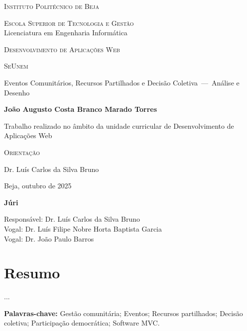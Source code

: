 \documentclass[12pt,a4paper,openright,oneside]{memoir}
\newcommand{\Institute}{Instituto Politécnico de Beja}
\newcommand{\School}{Escola Superior de Tecnologia e Gestão}
\newcommand{\Degree}{Licenciatura em Engenharia Informática}
\newcommand{\Course}{Desenvolvimento de Aplicações Web}
\newcommand{\Title}{SeUnem}
\newcommand{\Subtitle}{Eventos Comunitários, Recursos Partilhados e Decisão Coletiva\mbox{ --- }Análise e Desenho}
\newcommand{\Author}{João Augusto Costa Branco Marado Torres}
\newcommand{\Advisor}{Dr. Luís Carlos da Silva Bruno}
\newcommand{\JuryMemberFirst}{Dr. Luís Filipe Nobre Horta Baptista Garcia}
\newcommand{\JuryMemberSecond}{Dr. João Paulo Barros}
\newcommand{\Date}{Beja, outubro de 2025}
\begin{document}
\thispagestyle{empty}
\begin{center}
    \textsc{\large \Institute}

    \bigskip

    \textsc{\large \School}\\{\large \Degree}

    \bigskip

    \textsc{\large \Course}

    \vspace{4\baselineskip}

    \textsc{\Huge \Title}

    \smallskip

    {\Large \Subtitle}

    \bigskip

    {\large\bfseries \Author}

    \vspace{2\baselineskip}

    {\large Trabalho realizado no âmbito da unidade curricular de \Course}

    \vspace{2\baselineskip}

    \textsc{Orientação}

    \bigskip

    \Advisor

    \vfill

    {\footnotesize \Date}
\end{center}

\cleardoublepage

\thispagestyle{empty}
\begin{center}
  \textbf{Júri}

  \bigskip

  Responsável: \Advisor\\
  Vogal: \JuryMemberFirst\\
  Vogal: \JuryMemberSecond\\
\end{center}
\clearpage


\chapter*{Resumo}
\noindent
...

\bigskip

\textbf{Palavras-chave:} Gestão comunitária; Eventos; Recursos partilhados;
Decisão coletiva; Participação democrática; Software MVC.
\end{document}

